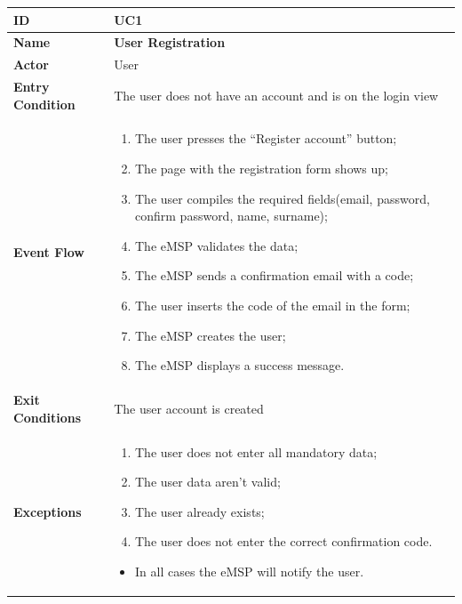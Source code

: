 \documentclass{Configuration_Files/PoliMi3i_thesis}
\begin{document}

\begin{table}[H]
    \begin{xltabular}{\textwidth}{| >{}l | X |}
    \hline
    \textbf{ID} & \textbf{UC1}\T\B\\
    \hline
    \textbf{Name} & \textbf{User Registration}\T\B\\
    \hline \hline
    \textbf{Actor} & User\T\B \\
    \hline
    \textbf{Entry Condition} & The user does not have an account and is on the login view\T\B\\
    \hline
    \textbf{Event Flow} & 
        \begin{enumerate}
        \item The user presses the “Register account” button;
        \item The page with the registration form shows up;
        \item The user compiles the required fields(email, password, confirm password, name, surname);
        \item The eMSP validates the data;
        \item The eMSP sends a confirmation email with a code;
        \item The user inserts the code of the email in the form;
        \item The eMSP creates the user;
        \item The eMSP displays a success message.
        \end{enumerate}\B\\
    \hline
    \textbf{Exit Conditions} & The user account is created\B\\
    \hline
    \textbf{Exceptions} & \begin{enumerate}
        \item The user does not enter all mandatory data;
        \item The user data aren’t valid;
        \item The user already exists;
        \item The user does not enter the correct confirmation code.
    \end{enumerate}
    \begin{itemize}
        \item In all cases the eMSP will notify the user.
    \end{itemize}\B\\
    \hline
    \end{xltabular}
\end{table}
\end{document}
